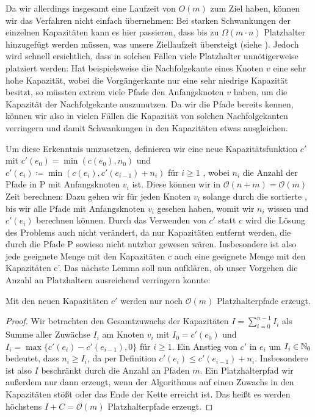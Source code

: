 Da wir allerdings insgesamt eine Laufzeit von $O(m)$ zum Ziel haben, können wir das  Verfahren
nicht einfach übernehmen:
Bei starken Schwankungen der einzelnen Kapazitäten kann es hier passieren, dass bis zu $\Omega(m\cdot n)$
Platzhalter hinzugefügt werden müssen, was unsere Ziellaufzeit übersteigt (siehe ).
Jedoch wird schnell ersichtlich, dass in solchen Fällen viele Platzhalter unnötigerweise platziert werden:
Hat beispielsweise die Nachfolgekante eines Knoten $v$ eine sehr hohe Kapazität, wobei die Vorgängerkante nur eine sehr
niedrige Kapazität besitzt, so müssten extrem viele Pfade den Anfangsknoten $v$ haben, um die Kapazität der
Nachfolgekante auszunutzen.
Da wir die Pfade bereits kennen, können wir also in vielen Fällen die Kapazität von solchen Nachfolgekanten verringern und
damit Schwankungen in den Kapazitäten etwas ausgleichen.

Um diese Erkenntnis umzusetzen, definieren wir eine neue Kapazitätsfunktion $c'$ mit $c'(e_0) = \min(c(e_0), n_0)$ und
$ c'(e_i) \coloneqq \min(c(e_i), c'(e_{i-1}) + n_i)$ für $i \geq 1$ , wobei $n_i$ die Anzahl der Pfade in P mit
Anfangsknoten $v_i$ ist.
Diese können wir in $\mathcal O(n + m) = \mathcal O(m)$ Zeit berechnen: Dazu gehen wir für jeden Knoten $v_i$ solange durch die sortierte
, bis wir alle Pfade mit Anfangsknoten $v_i$ gesehen haben, womit wir
$n_i$ wissen und $c'(e_i)$ berechnen können.
Durch das Verwenden von $c'$ statt $c$ wird die Lösung des Problems auch nicht verändert, da nur Kapazitäten entfernt
werden, die durch die Pfade P sowieso nicht nutzbar gewesen wären.
Insbesondere ist also jede geeignete Menge mit den Kapazitäten c auch eine geeignete Menge mit den Kapazitäten c'.
Das nächste Lemma soll nun aufklären, ob unser Vorgehen die Anzahl an Platzhaltern ausreichend verringern konnte:

\begin{lemma}
    Mit den neuen Kapazitäten $c'$ werden nur noch $\mathcal O(m)$ Platzhalterpfade erzeugt.
\end{lemma}
\begin{proof}
    Wir betrachten den Gesamtzuwachs der Kapazitäten $I = \sum_{i = 0}^{n-1} I_i$ als Summe aller Zuwächse $I_i$ am
    Knoten $v_i$ mit $I_0 = c'(e_0)$ und $I_i = \max\{c'(e_i) - c'(e_{i-1}), 0\}$ für $i \geq 1$.
    Ein Anstieg von $c'$ in $e_i$ um $I_i \in \mathbb N_0$ bedeutet, dass $n_i \geq I_i$, da per Definition
    $c'(e_i) \leq c'(e_{i-1}) + n_i$.
    Insbesondere ist also $I$ beschränkt durch die Anzahl an Pfaden $m$.
    Ein Platzhalterpfad wir außerdem nur dann erzeugt, wenn der Algorithmus auf einen Zuwachs in den Kapazitäten stößt
    oder das Ende der Kette erreicht ist.
    Das heißt es werden höchstens $I + C = \mathcal O(m)$ Platzhalterpfade erzeugt.
\end{proof}

